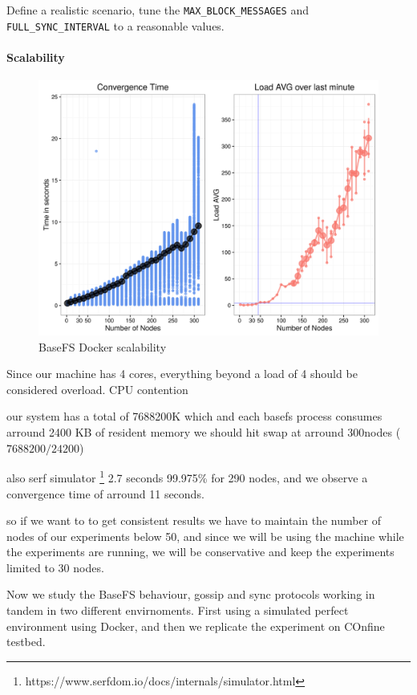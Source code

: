 \documentclass{sig-alternate}
\begin{document}
Define a realistic scenario, tune the \texttt{MAX\_BLOCK\_MESSAGES} and \texttt{FULL\_SYNC\_INTERVAL} to a reasonable values.


\paragraph{Scalability}

\begin{figure}[htp]
\centering
\includegraphics[width=\columnwidth]{../eval/plots/scalability.png}
\caption{BaseFS Docker scalability}
\label{fig:scalability}
\end{figure}

Since our machine has 4 cores, everything beyond a load of 4 should be considered overload. CPU contention

our system has a total of 7688200K which and each basefs process consumes arround 2400 KB of resident memory we should hit swap at arround 300nodes ($7688200/24200$)

also serf simulator \footnote{https://www.serfdom.io/docs/internals/simulator.html} 2.7 seconds 99.975\% for 290 nodes, and we observe a convergence time of arround 11 seconds.

so if we want to to get consistent results we have to maintain the number of nodes of our experiments below 50, and since we will be using the machine while the experiments are running, we will be conservative and keep the experiments limited to 30 nodes.


Now we study the BaseFS behaviour, gossip and sync protocols working in tandem in two different envirnoments. First using a simulated perfect environment using Docker, and then we replicate the experiment on COnfine testbed.
\end{document}
